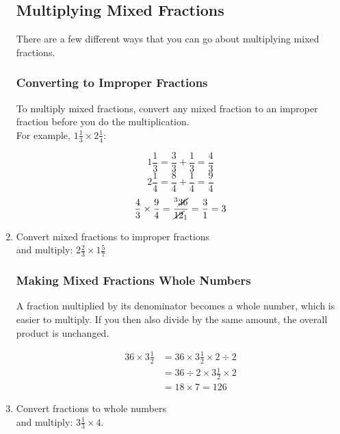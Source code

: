\documentclass[14pt]{article}
\begin{document}
\begin{enumerate}
\subsection*{Multiplying Mixed Fractions}
There are a few different ways that you can go about multiplying mixed fractions.\\

\subsubsection*{Converting to Improper Fractions}
To multiply mixed fractions, convert any mixed fraction to an improper fraction before you do the multiplication.\\

For example, $1 \frac{1}{3} \times 2 \frac{1}{4}:$

$$1 \frac{1}{3} = \frac{3}{3} + \frac{1}{3} = \frac{4}{3}$$
$$2 \frac{1}{4} = \frac{8}{4} + \frac{1}{4} = \frac{9}{4}$$
$$\frac{4}{3} \times \frac{9}{4} = \frac{^3 \cancel{36}}{\cancel{12}_1} = \frac{3}{1} = 3$$

\item Convert mixed fractions to improper fractions\\ and multiply: $2 \frac{2}{3} \times1 \frac{5}{7}$

\subsubsection*{Making Mixed Fractions Whole Numbers}
A fraction multiplied by its denominator becomes a whole number, which is easier to multiply. If you then also divide by the same amount, the overall product is unchanged.

\begin{align*}
36 \times 3 \frac{1}{2} &= 36 \times 3 \frac{1}{2} \times 2 \div 2\\
&= 36 \div 2 \times 3 \frac{1}{2} \times 2\\
&= 18 \times 7 = 126
\end{align*}

\item Convert fractions to whole numbers\\ and multiply: $3\frac{1}{3}\times4$.


\end{enumerate}
\end{document}
